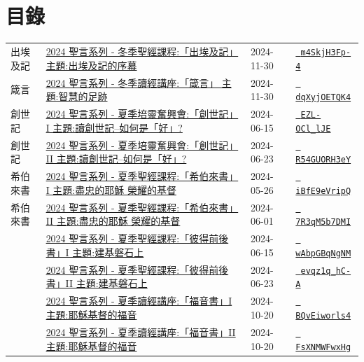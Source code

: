 \documentclass{book}
\begin{document}
\section{目錄}
\label{sec:index}
{ \scriptsize


\begin{xltabular}{\textwidth}{|p{0.15\textwidth} p{0.6\textwidth}|p{0.07\textwidth} p{0.1\textwidth}|}
\hline
出埃及記   & \hyperref[sec:m4SkjH3Fp_4]{2024 聖言系列 - 冬季聖經課程:「出埃及記」 主題:出埃及記的序幕} & 2024-11-30 & \href{https://youtube.com/watch?v=m4SkjH3Fp-4}{\texttt{ m4SkjH3Fp-4}} \\
箴言   & \hyperref[sec:dqXyjOETQK4]{2024 聖言系列 - 冬季讀經講座:「箴言」 主題:智慧的足跡} & 2024-11-30 & \href{https://youtube.com/watch?v=dqXyjOETQK4}{\texttt{ dqXyjOETQK4}} \\
創世記   & \hyperref[sec:EZL_OCl_lJE]{2024 聖言系列 - 夏季培靈奮興會:「創世記」I 主題:讀創世記–如何是「好」?} & 2024-06-15 & \href{https://youtube.com/watch?v=EZL-OCl_lJE}{\texttt{ EZL-OCl\_lJE}} \\
創世記   & \hyperref[sec:R54GUORH3eY]{2024 聖言系列 - 夏季培靈奮興會:「創世記」II 主題:讀創世記–如何是「好」?} & 2024-06-23 & \href{https://youtube.com/watch?v=R54GUORH3eY}{\texttt{ R54GUORH3eY}} \\
希伯來書   & \hyperref[sec:iBfE9eVripQ]{2024 聖言系列 - 夏季聖經課程:「希伯來書」I 主題:盡忠的耶穌 榮耀的基督} & 2024-05-26 & \href{https://youtube.com/watch?v=iBfE9eVripQ}{\texttt{ iBfE9eVripQ}} \\
希伯來書   & \hyperref[sec:7R3qM5b7DMI]{2024 聖言系列 - 夏季聖經課程:「希伯來書」II 主題:盡忠的耶穌 榮耀的基督} & 2024-06-01 & \href{https://youtube.com/watch?v=7R3qM5b7DMI}{\texttt{ 7R3qM5b7DMI}} \\
    & \hyperref[sec:wAbpGBqNgNM]{2024 聖言系列 - 夏季聖經課程:「彼得前後書」I 主題:建基磐石上} & 2024-06-15 & \href{https://youtube.com/watch?v=wAbpGBqNgNM}{\texttt{ wAbpGBqNgNM}} \\
    & \hyperref[sec:evqz1q_hC_A]{2024 聖言系列 - 夏季聖經課程:「彼得前後書」II 主題:建基磐石上} & 2024-06-23 & \href{https://youtube.com/watch?v=evqz1q_hC-A}{\texttt{ evqz1q\_hC-A}} \\
    & \hyperref[sec:BQvEiworls4]{2024 聖言系列 - 夏季讀經講座:「福音書」I 主題:耶穌基督的福音} & 2024-10-20 & \href{https://youtube.com/watch?v=BQvEiworls4}{\texttt{ BQvEiworls4}} \\
    & \hyperref[sec:FsXNMWFwxHg]{2024 聖言系列 - 夏季讀經講座:「福音書」II 主題:耶穌基督的福音} & 2024-10-20 & \href{https://youtube.com/watch?v=FsXNMWFwxHg}{\texttt{ FsXNMWFwxHg}} \\

\end{xltabular}}
\end{document}
